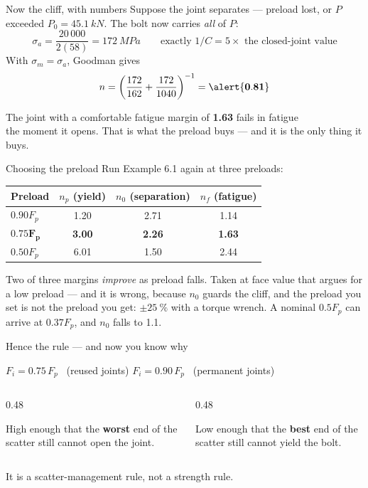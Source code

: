 \documentclass[aspectratio=169,10pt]{beamer}
\begin{document}
\begin{frame}{Now the cliff, with numbers}
Suppose the joint separates --- preload lost, or $P$ exceeded $P_0=\SI{45.1}{kN}$. The bolt now
carries \emph{all} of $P$:
\[
\sigma_a=\frac{20\,000}{2(58)}=\SI{172}{MPa}
\qquad\text{exactly } 1/C = 5\times \text{ the closed-joint value}
\]
\vfill
With $\sigma_m=\sigma_a$, Goodman gives
\[
n=\left(\frac{172}{162}+\frac{172}{1040}\right)^{-1}=\alert{\mathbf{0.81}}
\]
\vfill
\begin{alertblock}{}
\centering\large
The joint with a comfortable fatigue margin of \textbf{1.63} fails in fatigue\\ the moment it opens.
\vspace{2pt}
\normalsize That is what the preload buys --- and it is the only thing it buys.
\end{alertblock}
\end{frame}

\begin{frame}{Choosing the preload}
Run Example 6.1 again at three preloads:
\vfill
\centering\small
\begin{tabular}{@{}lccc@{}}
\toprule
Preload & $n_p$ (yield) & $n_0$ (separation) & $n_f$ (fatigue)\\
\midrule
$0.90F_p$ & 1.20 & 2.71 & 1.14\\
$\mathbf{0.75F_p}$ & \textbf{3.00} & \textbf{2.26} & \textbf{1.63}\\
$0.50F_p$ & 6.01 & 1.50 & 2.44\\
\bottomrule
\end{tabular}
\vfill
\raggedright
Two of three margins \emph{improve} as preload falls. Taken at face value that argues for a low
preload --- and it is wrong, because $n_0$ guards the cliff, \alert{and the preload you set is not
the preload you get}: $\pm\SI{25}{\percent}$ with a torque wrench.
\vfill
\centering
A nominal $0.5F_p$ can arrive at $0.37F_p$, and $n_0$ falls to 1.1.
\end{frame}

\begin{frame}{Hence the rule --- and now you know why}
\begin{center}
\Large
$F_i = 0.75\,F_p$ \ (reused joints) \qquad $F_i = 0.90\,F_p$ \ (permanent joints)
\end{center}
\vfill
\begin{columns}[T]
\begin{column}{0.48\textwidth}
\begin{block}{High enough}
that the \textbf{worst} end of the scatter still cannot open the joint.
\end{block}
\end{column}
\begin{column}{0.48\textwidth}
\begin{block}{Low enough}
that the \textbf{best} end of the scatter still cannot yield the bolt.
\end{block}
\end{column}
\end{columns}
\vfill
\centering
It is a scatter-management rule, not a strength rule.
\end{frame}
\end{document}
